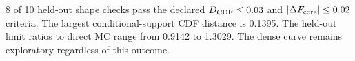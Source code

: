 8 of 10 held-out shape checks pass the declared $D_{\rm CDF}\leq0.03$ and $|\Delta F_{\rm core}|\leq0.02$ criteria. The largest conditional-support CDF distance is 0.1395. The held-out limit ratios to direct MC range from 0.9142 to 1.3029. The dense curve remains exploratory regardless of this outcome.
